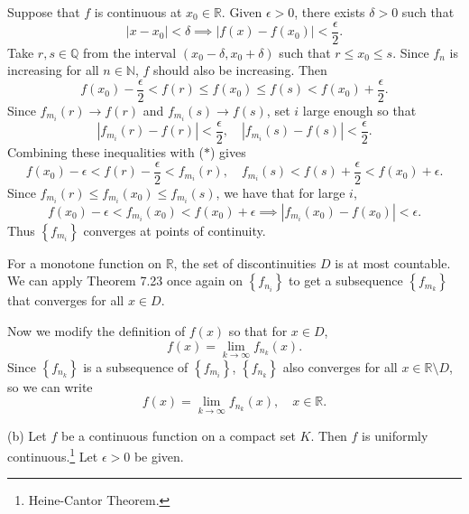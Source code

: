 \documentclass[12pt]{report}
\newcommand{\bs}{\setminus}
\newcommand{\abs}[1]{\left| #1 \right|}
\newcommand{\seq}[1]{\left\{ #1 \right\}}
\newcommand{\ra}{\rightarrow}
\newcommand{\mast}{\(\ast\)}
\newcommand{\R}{\mathbb{R}}
\newcommand{\N}{\mathbb{N}}
\newcommand{\Q}{\mathbb{Q}}
\begin{document}
\begin{enumerate}
    Suppose that \(f\) is continuous at \(x_0 \in \R\). Given \(\epsilon > 0\), there exists \(\delta > 0\) such that
    \[
        \abs{x - x_0} < \delta \implies \abs{f(x) - f(x_0)} < \frac{\epsilon}{2}.
    \]
    Take \(r, s \in \Q\) from the interval \((x_0 - \delta, x_0 + \delta)\) such that \(r \leq x_0 \leq s\). Since \(f_n\) is increasing for all \(n \in \N\), \(f\) should also be increasing. Then
    \[ \tag{\mast}
        f(x_0) -\frac{\epsilon}{2} < f(r) \leq f(x_0) \leq f(s) < f(x_0) + \frac{\epsilon}{2}.
    \]
    Since \(f_{m_i}(r) \ra f(r)\) and \(f_{m_i}(s) \ra f(s)\), set \(i\) large enough so that
    \[
        \abs{f_{m_i}(r) - f(r)} < \frac{\epsilon}{2}, \quad \abs{f_{m_i}(s) - f(s)} < \frac{\epsilon}{2}.
    \]
    Combining these inequalities with (\mast) gives
    \[
        f(x_0) - \epsilon < f(r) - \frac{\epsilon}{2} < f_{m_i}(r), \quad f_{m_i}(s) < f(s) + \frac{\epsilon}{2} < f(x_0) + \epsilon.
    \]
    Since \(f_{m_i}(r) \leq f_{m_i}(x_0) \leq f_{m_i}(s)\), we have that for large \(i\),
    \[
        f(x_0) - \epsilon < f_{m_i}(x_0) < f(x_0) + \epsilon \implies \abs{f_{m_i}(x_0) - f(x_0)} < \epsilon.
    \]
    Thus \(\seq{f_{m_i}}\) converges at points of continuity.

    For a monotone function on \(\R\), the set of discontinuities \(D\) is at most countable. We can apply {\sffamily Theorem 7.23} once again on \(\seq{f_{n_i}}\) to get a subsequence \(\seq{f_{m_k}}\) that converges for all \(x \in D\).

    Now we modify the definition of \(f(x)\) so that for \(x \in D\),
    \[
        f(x) = \lim_{k \ra\infty} f_{n_k}(x).
    \]
    Since \(\seq{f_{n_k}}\) is a subsequence of \(\seq{f_{m_i}}\), \(\seq{f_{n_k}}\) also converges for all \(x \in \R \bs D\), so we can write
    \[
        f(x) = \lim_{k \ra \infty} f_{n_k}(x), \quad x \in \R.
    \]

    {\sffamily (b)} Let \(f\) be a continuous function on a compact set \(K\). Then \(f\) is uniformly continuous.\footnote{Heine-Cantor Theorem.} Let \(\epsilon > 0\) be given.


\end{enumerate}
\end{document}
